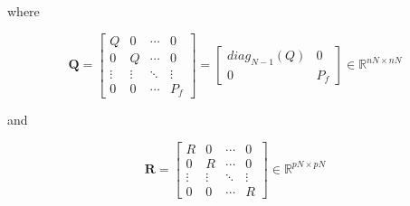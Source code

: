 \noindent
where

\begin{equation}
    \mathbf{Q} = 
    \left[
        \begin{matrix}
            Q & 0 & \cdots & 0 \\
            0 & Q & \cdots & 0 \\
            \vdots & \vdots & \ddots & \vdots \\
            0 & 0 & \cdots & P_f
        \end{matrix}
    \right]
    = 
    \left[
        \begin{matrix}
            diag_{N-1}(Q) & 0 \\
            0 & P_f
        \end{matrix}
    \right]
    \in \mathbb{R}^{nN \times nN}
\end{equation}

\noindent
and

\begin{equation}
    \mathbf{R} = 
    \left[
        \begin{matrix}
        R & 0 & \dotsm & 0 \\
        0 & R & \dotsm & 0 \\
        \vdots & \vdots & \ddots & \vdots \\
        0 & 0 & \dotsm & R
        \end{matrix}
    \right] \in \mathbb{R}^{pN \times pN}
\end{equation}
